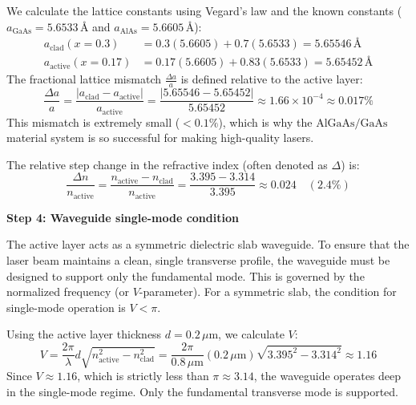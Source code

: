 We calculate the lattice constants using Vegard's law and the known constants ($a_{\text{GaAs}} = 5.6533\,\text{\AA}$ and $a_{\text{AlAs}} = 5.6605\,\text{\AA}$):
\begin{align*}
  a_{\text{clad}} (x=0.3) &= 0.3(5.6605) + 0.7(5.6533) = 5.65546\,\text{\AA} \\
  a_{\text{active}} (x=0.17) &= 0.17(5.6605) + 0.83(5.6533) = 5.65452\,\text{\AA}
\end{align*}
The fractional lattice mismatch $\frac{\Delta a}{a}$ is defined relative to the active layer:
\begin{equation*}
  \frac{\Delta a}{a} = \frac{|a_{\text{clad}} - a_{\text{active}}|}{a_{\text{active}}} = \frac{|5.65546 - 5.65452|}{5.65452} \approx 1.66 \times 10^{-4} \approx 0.017\%
\end{equation*}
This mismatch is extremely small ($<0.1\%$), which is why the $\text{AlGaAs/GaAs}$ material system is so successful for making high-quality lasers.

The relative step change in the refractive index (often denoted as $\Delta$) is:
\begin{equation*}
  \frac{\Delta n}{n_{\text{active}}} = \frac{n_{\text{active}} - n_{\text{clad}}}{n_{\text{active}}} = \frac{3.395 - 3.314}{3.395} \approx 0.024 \quad (2.4\%)
\end{equation*}

\textbf{Step 4: Waveguide single-mode condition}

The active layer acts as a symmetric dielectric slab waveguide. To ensure that the laser beam maintains a clean, single transverse profile, the waveguide must be designed to support only the fundamental mode. 
This is governed by the normalized frequency (or $V$-parameter). For a symmetric slab, the condition for single-mode operation is $V < \pi$.

Using the active layer thickness $d = 0.2\,\mu\text{m}$, we calculate $V$:
\begin{equation*}
  V = \frac{2\pi}{\lambda} d \sqrt{n_{\text{active}}^2 - n_{\text{clad}}^2} = \frac{2\pi}{0.8\,\mu\text{m}} (0.2\,\mu\text{m}) \sqrt{3.395^2 - 3.314^2} \approx 1.16
\end{equation*}
Since $V \approx 1.16$, which is strictly less than $\pi \approx 3.14$, the waveguide operates deep in the single-mode regime. Only the fundamental transverse mode is supported.


